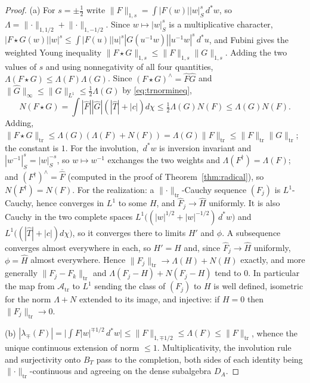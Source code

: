 \documentclass[11pt]{amsart}
\theoremstyle{definition}
\theoremstyle{remark}
\newcommand{\dstar}{\,d^{*}}
\newcommand{\Th}{\widehat{T}}
\newcommand{\DA}{D_A}
\newcommand{\Atr}{\mathcal A_{\mathrm{tr}}}
\newcommand{\BT}{B_T}
\begin{document}
\begin{proof}
(a)  For $s=\pm\tfrac12$ write $\lVert F\rVert_{1,s}=\int|F(w)||w|_S^{s}\dstar
w$, so $\Lambda=\lVert\cdot\rVert_{1,1/2}+\lVert\cdot\rVert_{1,-1/2}$.  Since
$w\mapsto|w|_S^{s}$ is a multiplicative character,
$|F\star G(w)||w|^{s}\le\int|F(u)||u|^{s}|G(u^{-1}w)||u^{-1}w|^{s}\dstar u$,
and Fubini gives the weighted Young inequality
$\lVert F\star G\rVert_{1,s}\le\lVert F\rVert_{1,s}\lVert G\rVert_{1,s}$.
Adding the two values of $s$ and using nonnegativity of all four quantities,
$\Lambda(F\star G)\le\Lambda(F)\Lambda(G)$.  Since $(F\star G)^{\wedge}=
\widehat F\widehat G$ and $\lVert\widehat G\rVert_{\infty}\le\lVert
G\rVert_{L^{1}}\le\tfrac12\Lambda(G)$ by \eqref{eq:trnormineq},
\[
N(F\star G)=\int|\widehat F||\widehat G|(|\Th|+|c|)d\chi
\le\tfrac12\Lambda(G)N(F)\le\Lambda(G)N(F).
\]
Adding, $\lVert F\star G\rVert_{\mathrm{tr}}\le\Lambda(G)
(\Lambda(F)+N(F))=\Lambda(G)\lVert F\rVert_{\mathrm{tr}}\le
\lVert F\rVert_{\mathrm{tr}}\lVert G\rVert_{\mathrm{tr}}$; the constant is $1$.
For the involution, $\dstar w$ is inversion invariant and
$|w^{-1}|_S^{s}=|w|_S^{-s}$, so $w\mapsto w^{-1}$ exchanges the two weights
and $\Lambda(F^{\dagger})=\Lambda(F)$; and $(F^{\dagger})^{\wedge}=
\overline{\widehat F}$ (computed in the proof of Theorem~\ref{thm:radical}), so
$N(F^{\dagger})=N(F)$.  For the realization: a
$\lVert\cdot\rVert_{\mathrm{tr}}$-Cauchy sequence $(F_j)$ is $L^{1}$-Cauchy,
hence converges in $L^{1}$ to some $H$, and $\widehat F_j\to\widehat H$
uniformly.  It is also Cauchy in the two complete spaces
$L^{1}\bigl((|w|^{1/2}+|w|^{-1/2})\dstar w\bigr)$ and
$L^{1}\bigl((|\Th|+|c|)d\chi\bigr)$, so it converges there to limits $H'$ and
$\phi$.  A subsequence converges almost everywhere in each, so $H'=H$ and,
since $\widehat F_j\to\widehat H$ uniformly, $\phi=\widehat H$ almost
everywhere.  Hence $\lVert F_j\rVert_{\mathrm{tr}}\to\Lambda(H)+N(H)$ exactly,
and more generally $\lVert F_j-F_k\rVert_{\mathrm{tr}}$ and
$\Lambda(F_j-H)+N(F_j-H)$ tend to $0$.  In particular the map from $\Atr$ to
$L^{1}$ sending the class of $(F_j)$ to $H$ is well defined, isometric for the
norm $\Lambda+N$ extended to its image, and injective: if $H=0$ then
$\lVert F_j\rVert_{\mathrm{tr}}\to0$.

(b)  $|\lambda_{\mp}(F)|=\bigl|\int F|w|^{\mp1/2}\dstar w\bigr|\le
\lVert F\rVert_{1,\mp1/2}\le\Lambda(F)\le\lVert F\rVert_{\mathrm{tr}}$, whence
the unique continuous extension of norm $\le1$.  Multiplicativity, the
involution rule and surjectivity onto $\BT$ pass to the completion, both sides
of each identity being $\lVert\cdot\rVert_{\mathrm{tr}}$-continuous and
agreeing on the dense subalgebra $\DA$.


\end{proof}
\end{document}
